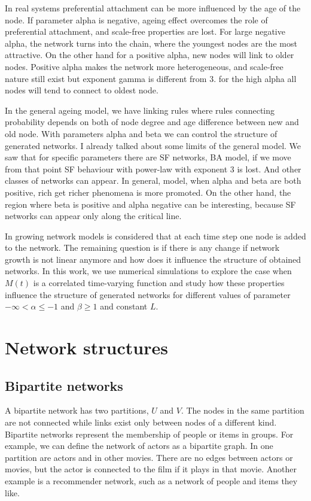In real systems preferential attachment can be more influenced by the age of the node. If parameter alpha is negative, ageing effect overcomes the role of preferential attachment, and scale-free properties are lost. For large negative alpha, the network turns into the chain, where the youngest nodes are the most attractive. On the other hand for a positive alpha, new nodes will link to older nodes. Positive alpha makes the network more heterogeneous, and scale-free nature still exist but exponent gamma is different from 3.  for the high alpha all nodes will tend to connect to oldest node. 

In the general ageing model, we have linking rules where rules connecting probability depends on both of node degree and age difference between new and old node.  With parameters alpha and beta we can control the structure of generated networks. I already talked about some limits of the general model. We saw that for specific parameters there are SF networks, BA model, if we move from that point SF behaviour with power-law with exponent 3 is lost. And other classes of networks can appear. In general, model, when alpha and beta are both positive, rich get richer phenomena is more promoted. On the other hand, the region where beta is positive and alpha negative can be interesting, because SF networks can appear only along the critical line. 

In growing network models is considered that at each time step one node is added to the network. The remaining question is if there is any change if network growth is not linear anymore and how does it influence the structure of obtained networks.  In this work, we use numerical simulations to explore the case when $M(t)$ is a correlated time-varying function and study how these properties influence the structure of generated networks for different values of parameter $-\infty<\alpha\leq-1$ and $\beta\geq1$ and constant $L$.

\section{ Network structures}
\subsection{Bipartite networks}

A bipartite network has two partitions, $U$ and $V$. The nodes in the same partition are not connected while links exist only between nodes of a different kind. Bipartite networks represent the membership of people or items in groups. For example, we can define the network of actors as a bipartite graph. In one partition are actors and in other movies. There are no edges between actors or movies, but the actor is connected to the film if it plays in that movie. Another example is a recommender network, such as a network of people and items they like. 

